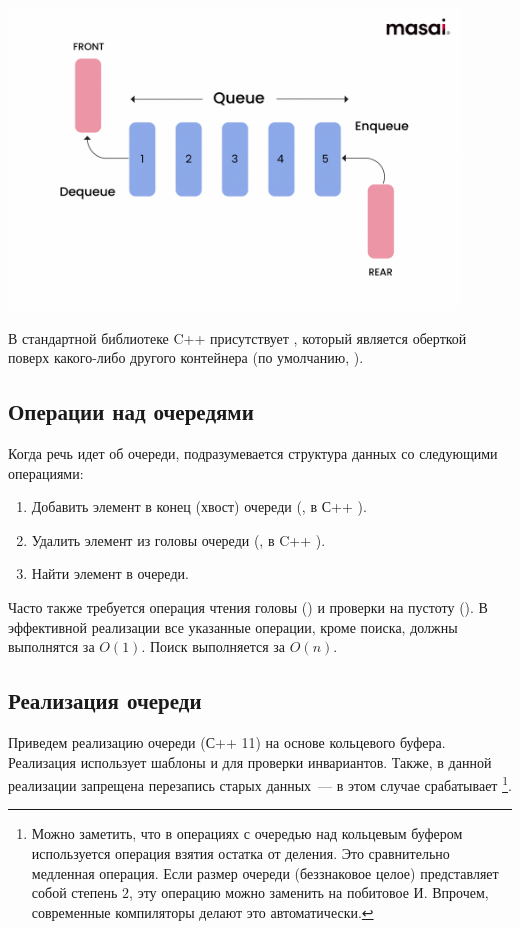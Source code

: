 \includegraphics[width=0.9\textwidth]{resources/19-26/queue.png}

В стандартной библиотеке C++ присутствует  , который является оберткой поверх
какого-либо другого контейнера (по умолчанию, ).

\subsection{Операции над очередями}
Когда речь идет об очереди, подразумевается структура данных со следующими операциями:
\begin{enumerate}
  \item Добавить элемент в конец (хвост) очереди (, в С++ ).
  \item Удалить элемент из головы очереди (, в C++ ).
  \item Найти элемент в очереди.
\end{enumerate}
%
Часто также требуется операция чтения головы () и проверки на пустоту (). В эффективной реализации
все указанные операции, кроме поиска, должны выполнятся за \(O(1)\). Поиск выполняется за $O(n)$.

\subsection{Реализация очереди}
Приведем реализацию очереди (С++ 11) на основе кольцевого буфера. Реализация использует шаблоны и 
для проверки инвариантов. Также, в данной реализации запрещена перезапись старых данных~--- в этом случае срабатывает  \footnote{Можно заметить, что в операциях с очередью над кольцевым буфером используется операция взятия остатка от деления. Это сравнительно
  медленная операция. Если размер очереди (беззнаковое целое) представляет собой степень \(2\), эту операцию можно заменить на побитовое И. Впрочем, современные
  компиляторы делают это автоматически.}.


